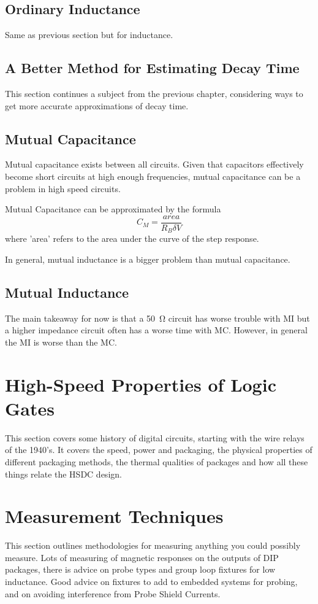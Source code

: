 \documentclass{article}
\begin{document}
	\subsection{Ordinary Inductance}
	Same as previous section but for inductance.
	\subsection{A Better Method for Estimating Decay Time}
	This section continues a subject from the previous chapter, considering ways to get more accurate approximations of decay time.
	\subsection{Mutual Capacitance}
	Mutual capacitance exists between all circuits. Given that capacitors effectively become short circuits at high enough frequencies, mutual capacitance can be a problem in high speed circuits.
	
	Mutual Capacitance can be approximated by the formula $$C_{M} = \frac{area}{R_{B}\delta V}$$ where 'area' refers to the area under the curve of the step response.
	
	In general, mutual inductance is a bigger problem than mutual capacitance.
	\subsection{Mutual Inductance}
	The main takeaway for now is that a \SI{50}{\ohm} circuit has worse trouble with MI but a higher impedance circuit often has a worse time with MC. However, in general the MI is worse than the MC.
	
	\section{High-Speed Properties of Logic Gates}
	This section covers some history of digital circuits, starting with the wire relays of the 1940's. It covers the speed, power and packaging, the physical properties of different packaging methods, the thermal qualities of packages and how all these things relate the HSDC design.
	
	\section{Measurement Techniques}
	This section outlines methodologies for measuring anything you could possibly measure. Lots of measuring of magnetic responses on the outputs of DIP packages, there is advice on probe types and group loop fixtures for low inductance. Good advice on fixtures to add to embedded systems for probing, and on avoiding interference from Probe Shield Currents.
	
\end{document}
